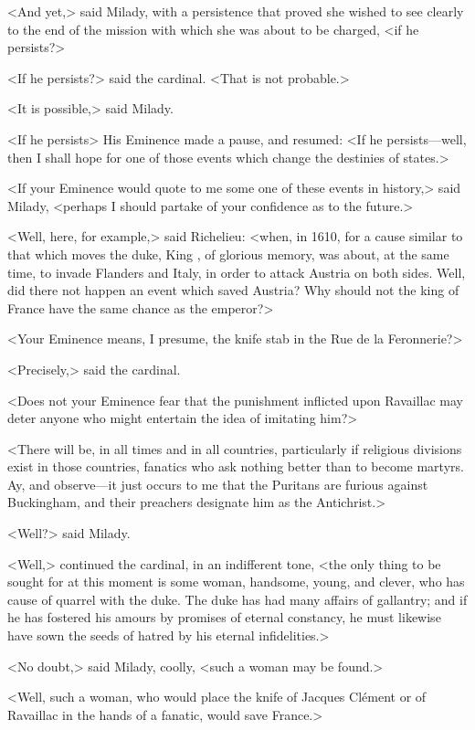 <And yet,> said Milady, with a persistence that proved she wished to see clearly to the end of the mission with which she was about to be charged, <if he persists?> 

<If he persists?> said the cardinal. <That is not probable.> 

<It is possible,> said Milady. 

<If he persists\longdash> His Eminence made a pause, and resumed: <If he persists—well, then I shall hope for one of those events which change the destinies of states.> 

<If your Eminence would quote to me some one of these events in history,> said Milady, <perhaps I should partake of your confidence as to the future.> 

<Well, here, for example,> said Richelieu: <when, in 1610, for a cause similar to that which moves the duke, King , of glorious memory, was about, at the same time, to invade Flanders and Italy, in order to attack Austria on both sides. Well, did there not happen an event which saved Austria? Why should not the king of France have the same chance as the emperor?> 

<Your Eminence means, I presume, the knife stab in the Rue de la Feronnerie?> 

<Precisely,> said the cardinal. 

<Does not your Eminence fear that the punishment inflicted upon Ravaillac may deter anyone who might entertain the idea of imitating him?> 

<There will be, in all times and in all countries, particularly if religious divisions exist in those countries, fanatics who ask nothing better than to become martyrs. Ay, and observe—it just occurs to me that the Puritans are furious against Buckingham, and their preachers designate him as the Antichrist.> 

<Well?> said Milady. 

<Well,> continued the cardinal, in an indifferent tone, <the only thing to be sought for at this moment is some woman, handsome, young, and clever, who has cause of quarrel with the duke. The duke has had many affairs of gallantry; and if he has fostered his amours by promises of eternal constancy, he must likewise have sown the seeds of hatred by his eternal infidelities.> 

<No doubt,> said Milady, coolly, <such a woman may be found.> 

<Well, such a woman, who would place the knife of Jacques Clément or of Ravaillac in the hands of a fanatic, would save France.> 

